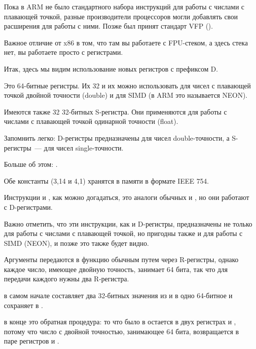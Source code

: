 
Пока в ARM не было стандартного набора инструкций для работы с числами с плавающей точкой, разные производители процессоров
могли добавлять свои расширения для работы с ними.
Позже был принят стандарт VFP ().

Важное отличие от x86 в том, что там вы работаете с FPU-стеком, а здесь стека нет, вы работаете просто с регистрами.



Итак, здесь мы видим использование новых регистров с префиксом D.

Это 64-битные регистры. Их 32 и их можно
использовать для чисел с плавающей точкой двойной точности (double) и для 
SIMD (в ARM это называется NEON).

Имеются также 32 32-битных S-регистра. Они применяются для работы с числами 
с плавающей точкой одинарной точности (float).

Запомнить легко: D-регистры предназначены для чисел double-точности, 
а S-регистры~--- для чисел single-точности.

Больше об этом: .

Обе константы (3,14 и 4,1) хранятся в памяти в формате IEEE 754.

Инструкции  и , как можно догадаться, это аналоги обычных  и \MOV, но они работают с D-регистрами.

Важно отметить, что эти инструкции, как и D-регистры, предназначены не только для работы 
с числами с плавающей точкой, но пригодны также и для работы с SIMD (NEON), и позже это также будет видно.

Аргументы передаются в функцию обычным путем через R-регистры, однако 
каждое число, имеющее двойную точность, занимает 64 бита, так что для передачи каждого нужны два R-регистра.

 в самом начале составляет два 32-битных значения из  и  в одно 64-битное и сохраняет в .

 в конце это обратная процедура: то что было в  
остается в двух регистрах  и , потому что число с двойной точностью, 
занимающее 64 бита, возвращается в паре регистров  и .

